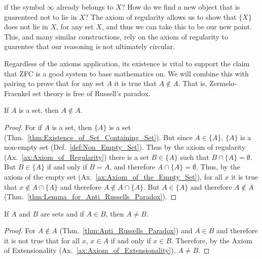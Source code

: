        if the symbol $\infty$ already belongs to $X$? How do we find a new
        object that is guarenteed not to lie in $X$? The axiom of regularity
        allows us to show that $\{X\}$ does not lie in $X$, for any set $X$, and
        thus we can take this to be our new point. This, and many similar
        constructions, rely on the axiom of regularity to guarentee that our
        reasoning is not ultimately circular.
        \par\hfill\par
        Regardless of the axioms application, its existence is vital to support
        the claim that ZFC is a good system to base mathematics on. We will
        combine this with pairing to prove that for any set $A$ it is true that
        $A\notin{A}$. That is, Zermelo-Fraenkel set theory is free of Russell's
        paradox.
        \begin{theorem}
            \label{thm:Anti_Russells_Paradox}%
            If $A$ is a set, then $A\notin{A}$.
        \end{theorem}
        \begin{proof}
            For if $A$ is a set, then $\{A\}$ is a set
            (Thm.~\ref{thm:Existence_of_Set_Containing_Set}). But since
            $A\in\{A\}$, $\{A\}$ is a non-empty set
            (Def.~\ref{def:Non_Empty_Set}). Thus by the axiom of regularity
            (Ax.~\ref{ax:Axiom_of_Regularity}) there is a set $B\in\{A\}$ such
            that $B\cap\{A\}=\emptyset$. But $B\in\{A\}$ if and only if
            $B=A$, and therefore $A\cap\{A\}=\emptyset$. Thus, by the axiom of
            the empty set (Ax.~\ref{ax:Axiom_of_the_Empty_Set}), for all $x$ it
            is true that $x\notin{A}\cap\{A\}$ and therefore
            $A\notin{A}\cap\{A\}$. But $A\in\{A\}$ and therefore
            $A\notin{A}$ (Thm.~\ref{thm:Lemma_for_Anti_Russells_Paradox}).
        \end{proof}
        \begin{theorem}
            \label{thm:Containment_NEqual_Underlying_Set}%
            If $A$ and $B$ are sets and if $A\in{B}$, then $A\ne{B}$.
        \end{theorem}
        \begin{proof}
            For $A\notin{A}$ (Thm.~\ref{thm:Anti_Russells_Paradox}) and
            $A\in{B}$ and therefore it is not true that for all $x$, $x\in{A}$
            if and only if $x\in{B}$. Therefore, by the Axiom of
            Extensionality (Ax.~\ref{ax:Axiom_of_Extensionality}), $A\ne{B}$.
        \end{proof}
